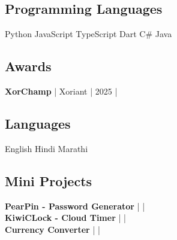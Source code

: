\documentclass[]{deedy-resume-reversed}
\begin{document}
\begin{minipage}[t]{0.33\textwidth}
\subsection{Programming Languages}
Python \textbullet JavaScript \textbullet TypeScript \textbullet Dart \textbullet C\# \textbullet Java \\
\sectionsep

\subsection{Awards}
\textbf{XorChamp} | Xoriant | 2025  | 
\href{https://github.com/sunnydodti/resume/blob/main/awards/XorChamp%20-%20Sunny%20Dodti.pdf}{\faExternalLink } 
\sectionsep

\subsection{Languages}
English \textbullet Hindi \textbullet Marathi \\
\sectionsep

\subsection{Mini Projects}
\textbf{PearPin - Password Generator} | \href{https://github.com/sunnydodti/pearpin}{\faGithub} | \href{https://pearpin.persist.site}{\faExternalLink} \\
\textbf{KiwiCLock - Cloud Timer} | \href{https://github.com/sunnydodti/kiwiclock}{\faGithub} | \href{https://kiwiclock.persist.site}{\faExternalLink} \\
\textbf{Currency Converter} | \href{https://github.com/sunnydodti/currency_converter}{\faGithub} | \href{https://sunnydodti.github.io/currency_converter}{\faExternalLink}
\sectionsep

\end{minipage}
\end{document}
